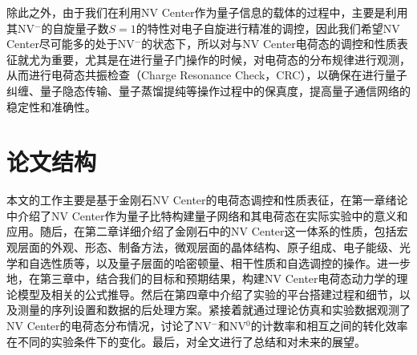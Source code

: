 \documentclass[type = bachelor, oneside]{whu-thesis}
\begin{document}
除此之外，由于我们在利用NV Center作为量子信息的载体的过程中，主要是利用其NV$^-$的自旋量子数$S=1$的特性对电子自旋进行精准的调控，因此我们希望NV Center尽可能多的处于NV$^-$的状态下，所以对与NV Center电荷态的调控和性质表征就尤为重要，尤其是在进行量子门操作的时候，对电荷态的分布规律进行观测，从而进行电荷态共振检查（Charge Resonance Check，CRC），以确保在进行量子纠缠、量子隐态传输、量子蒸馏提纯等操作过程中的保真度，提高量子通信网络的稳定性和准确性。

\section{论文结构}

本文的工作主要是基于金刚石NV Center的电荷态调控和性质表征，在第一章绪论中介绍了NV Center作为量子比特构建量子网络和其电荷态在实际实验中的意义和应用。随后，在第二章详细介绍了金刚石中的NV Center这一体系的性质，包括宏观层面的外观、形态、制备方法，微观层面的晶体结构、原子组成、电子能级、光学和自选性质等，以及量子层面的哈密顿量、相干性质和自选调控的操作。进一步地，在第三章中，结合我们的目标和预期结果，构建NV Center电荷态动力学的理论模型及相关的公式推导。然后在第四章中介绍了实验的平台搭建过程和细节，以及测量的序列设置和数据的后处理方案。紧接着就通过理论仿真和实验数据观测了NV Center的电荷态分布情况，讨论了NV$^-$和NV$^0$的计数率和相互之间的转化效率在不同的实验条件下的变化。最后，对全文进行了总结和对未来的展望。
 
\end{document}

